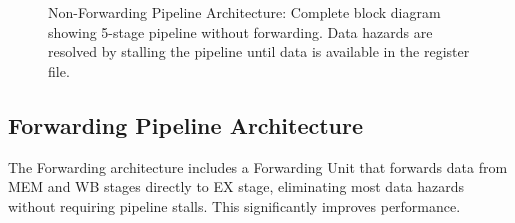 \begin{landscape}
\begin{figure}[ht]
    \caption{Non-Forwarding Pipeline Architecture: Complete block diagram showing 5-stage pipeline without forwarding. Data hazards are resolved by stalling the pipeline until data is available in the register file.}
    \label{fig:non_forwarding_pipeline}
\end{figure}
\end{landscape}

\subsection{Forwarding Pipeline Architecture}

The Forwarding architecture includes a Forwarding Unit that forwards data from MEM and WB stages directly to EX stage, eliminating most data hazards without requiring pipeline stalls. This significantly improves performance.

